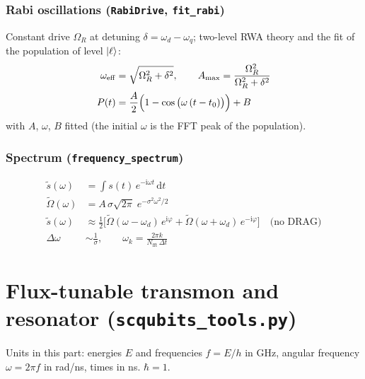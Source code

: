 \documentclass[11pt]{article}
\newcommand{\dd}{\mathrm{d}}
\newcommand{\ii}{\mathrm{i}}
\begin{document}
\section*{Rabi oscillations (\texttt{RabiDrive}, \texttt{fit\_rabi})}
Constant drive $\Omega_R$ at detuning $\delta = \omega_d - \omega_q$; two-level RWA theory and
the fit of the population of level $\ket{\ell}$:
\begin{align}
  \omega_{\rm eff} &= \sqrt{\Omega_R^2 + \delta^2}, \qquad
  A_{\rm max} = \frac{\Omega_R^2}{\Omega_R^2 + \delta^2} \\
  P(t) &= \frac{A}{2}\Big(1 - \cos\big(\omega\,(t - t_0)\big)\Big) + B
\end{align}
with $A$, $\omega$, $B$ fitted (the initial $\omega$ is the FFT peak of the population).

\section*{Spectrum (\texttt{frequency\_spectrum})}
\begin{align}
  \tilde{s}(\omega) &= \int s(t)\,e^{-\ii\omega t}\,\dd t \\
  \tilde{\Omega}(\omega) &= A\,\sigma\sqrt{2\pi}\;e^{-\sigma^2\omega^2/2} \\
  \tilde{s}(\omega) &\approx \frac{1}{2}\Big[\tilde{\Omega}(\omega - \omega_d)\,e^{\ii\varphi}
     + \tilde{\Omega}(\omega + \omega_d)\,e^{-\ii\varphi}\Big]
     \quad \text{(no DRAG)} \\
  \Delta\omega &\sim \frac{1}{\sigma}, \qquad
  \omega_k = \frac{2\pi k}{N_{\text{fft}}\,\Delta t}
\end{align}

\part*{Flux-tunable transmon and resonator (\texttt{scqubits\_tools.py})}
\noindent Units in this part: energies $E$ and frequencies $f = E/h$ in GHz,
angular frequency $\omega = 2\pi f$ in rad/ns, times in ns. $\hbar = 1$.

\end{document}
